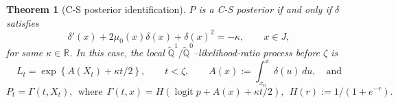 \documentclass[11pt, reqno]{amsart}
\theoremstyle{plain}
\newtheorem{theorem}{Theorem}[section]
\theoremstyle{remark}
\newcommand{\logit}{\operatorname{logit}}
\numberwithin{equation}{section}
\begin{document}
%
\begin{theorem}[C-S posterior identification]\label{thm:recognition}
$P$ is a C-S posterior if and only if $\delta$ satisfies 
\begin{equation}\label{eq:riccati}
  \delta'(x)+2\mu_0(x)\delta(x)+\delta(x)^2=-\kappa,
  \qquad x\in J,
\end{equation}
for some $\kappa\in\mathbb{R}$.
In this case, the local $\widetilde{\mathbb{Q}}^1/\widetilde{\mathbb{Q}}^0$--likelihood-ratio process before $\zeta$ is
\begin{equation}\label{eq:path-independent-L}
  L_t=\exp\left\{
    A(X_{t})+\kappa t/2
  \right\},
  \qquad t<\zeta, \qquad 
  A(x):=\int_{x_0}^x\delta(u)\,du, \quad \text{and}
\end{equation}
%
\begin{equation}\label{eq:current-state-map}
 P_t=\Gamma(t,X_t), \ \ \text{where} \ \ \Gamma(t,x)=H\left(\logit p+A(x)+\kappa t/2\right),
  \ \
  H(r):=1/(1+e^{-r}).
\end{equation}
\end{theorem}
\end{document}
